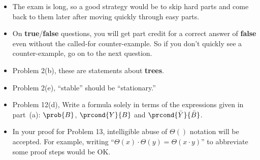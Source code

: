\documentclass[handout]{mcs}
\begin{document}

\begin{center}

\end{center}

\begin{itemize}

\item The exam is long, so a good strategy would be to skip hard parts
  and come back to them later after moving quickly through easy parts.

\item On \textbf{true}/\textbf{false} questions, you will get part
  credit for a correct answer of \textbf{false} even without the
  called-for counter-example.  So if you don't quickly see a
  counter-example, go on to the next question.

\item Problem 2(b), these are statements about \textbf{trees}.

\item Problem 2(e), ``stable'' should be ``stationary.''

\item Problem 12(d), Write a formula solely in terms of the
  expressions given in part~(a):
  $\prob{B}$, $\prcond{Y}{B}$ and $\prcond{\bar{Y}}{\bar{B}}$.

\item In your proof for Problem 13, intelligible abuse of $\Theta()$
  notation will be accepted.  For example, writing ``$\Theta(x) \cdot
  \Theta(y) = \Theta(x \cdot y)$'' to abbreviate some proof steps
  would be OK.

\end{itemize}
\end{document}
